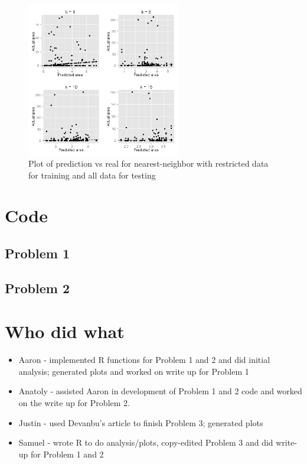 \documentclass{article}
\begin{document}
\begin{figure}
  \centering
  \includegraphics[width=0.6\textwidth]{figures/knn_good_all.png}
  \caption{Plot of prediction vs real for nearest-neighbor with restricted data
    for training and all data for testing}
  \label{fig:knn_all}
\end{figure}

\newpage

\section{Code}
\subsection{Problem 1}

\subsection{Problem 2}


\section{Who did what}
\begin{itemize}
	\item Aaron - implemented R functions for Problem 1 and 2 and did initial analysis; generated plots and worked on write up for Problem 1
	\item Anatoly - assisted Aaron in development of Problem 1 and 2 code and worked on the write up for Problem 2.
	\item Justin - used Devanbu's article to finish Problem 3; generated plots
	\item Samuel - wrote R to do analysis/plots, copy-edited Problem 3 and did write-up for Problem 1 and 2
\end{itemize}
\end{document}
